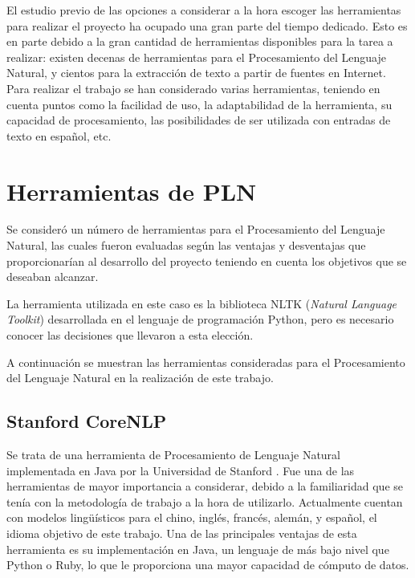 \lhead{\emph{\ChapterOne{}}}
El estudio previo de las opciones a considerar a la hora escoger las herramientas para realizar el proyecto ha ocupado una gran parte del tiempo dedicado.
%
Esto es en parte debido a la gran cantidad de herramientas disponibles para la tarea a realizar: existen decenas de herramientas para el Procesamiento del Lenguaje Natural, y cientos para la extracción de texto a partir de fuentes en Internet.
%
Para realizar el trabajo se han considerado varias herramientas, teniendo en cuenta puntos como la facilidad de uso, la adaptabilidad de la herramienta, su capacidad de procesamiento, las posibilidades de ser utilizada con entradas de texto en español, etc.

\section{Herramientas de PLN}

Se consideró un número de herramientas para el Procesamiento del Lenguaje Natural, las cuales fueron evaluadas según las ventajas y desventajas que proporcionarían al desarrollo del proyecto teniendo en cuenta los objetivos que se deseaban alcanzar.

La herramienta utilizada en este caso es la biblioteca NLTK (\textit{Natural Language Toolkit}) desarrollada en el lenguaje de programación Python, pero es necesario conocer las decisiones que llevaron a esta elección.

A continuación se muestran las herramientas consideradas para el Procesamiento del Lenguaje Natural en la realización de este trabajo.

\subsection{Stanford CoreNLP}

Se trata de una herramienta de Procesamiento de Lenguaje Natural implementada en Java por la Universidad de Stanford \cite{stanford-corenlp-paper}.
%
%
Fue una de las herramientas de mayor importancia a considerar, debido a la familiaridad que se tenía con la metodología de trabajo a la hora de utilizarlo.
%
Actualmente cuentan con modelos lingüísticos para el chino, inglés, francés, alemán, y español, el idioma objetivo de este trabajo.
%
Una de las principales ventajas de esta herramienta es su implementación en Java, un lenguaje de más bajo nivel que Python o Ruby, lo que le proporciona una mayor capacidad de cómputo de datos.

